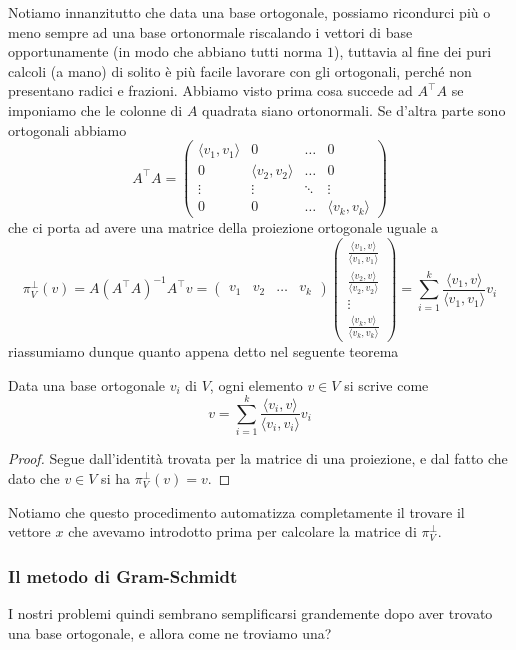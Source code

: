\documentclass[11pt]{scrartcl}
\begin{document}
   	 Notiamo innanzitutto che data una base ortogonale, possiamo ricondurci più o meno sempre ad una base ortonormale riscalando i vettori di base opportunamente (in modo che abbiano tutti norma $1$), tuttavia al fine dei puri calcoli (a mano) di solito è più facile lavorare con gli ortogonali, perché non presentano radici e frazioni. Abbiamo visto prima cosa succede ad $A^\intercal A$ se imponiamo che le colonne di $A$ quadrata siano ortonormali. Se d'altra parte sono ortogonali abbiamo
   	 $$A^\intercal A=
   	 \begin{pmatrix}
   	 	\langle v_1,v_1\rangle & 0 & \dots & 0 \\
   	 	0 & \langle v_2,v_2\rangle & \dots & 0 \\
   	 	\vdots & \vdots & \ddots & \vdots \\
   	 	0 & 0 & \dots & \langle v_k,v_k\rangle 
   	 \end{pmatrix}
   	 $$
   	 che ci porta ad avere una matrice della proiezione ortogonale uguale a 
   	 $$\pi_V^\perp (v)=A(A^\intercal A)^{-1}A^\intercal v=
   	 \left(
   	 \begin{array}{c|c|c|c}
   	 	v_1 & v_2 & \dots & v_k
   	 \end{array}
   	 \right)
   	 \begin{pmatrix}
   	 	\frac{\langle v_1,v \rangle}{\langle v_1,v_1\rangle} \\
   	 	\frac{\langle v_2,v \rangle}{\langle v_2,v_2\rangle} \\
   	 	\vdots \\
   	 	\frac{\langle v_k,v \rangle}{\langle v_k,v_k\rangle}
   	 \end{pmatrix}
   	 =\sum_{i=1}^{k}\frac{\langle v_1,v \rangle}{\langle v_1,v_1\rangle}v_i
   	 $$
   	 riassumiamo dunque quanto appena detto nel seguente teorema
   	 \begin{theorem}[Parseval]
   	 	Data una base ortogonale $v_i$ di $V$, ogni elemento $v\in V$ si scrive come
   	 	$$
   	 	v=\sum_{i=1}^k \frac{\langle v_i,v \rangle}{\langle v_i,v_i \rangle}v_i
   	 	$$
   	 \end{theorem}
   	 \begin{proof}
   	 	Segue dall'identità trovata per la matrice di una proiezione, e dal fatto che dato che $v\in V$ si ha $\pi_V^\perp(v)=v$.
   	 \end{proof}
   	 Notiamo che questo procedimento automatizza completamente il trovare il vettore $x$ che avevamo introdotto prima per calcolare la matrice di $\pi_V^\perp$. 
   	 \subsubsection{Il metodo di Gram-Schmidt}
   	 I nostri problemi quindi sembrano semplificarsi grandemente dopo aver trovato una base ortogonale, e allora come ne troviamo una?
   	 
\end{document}
